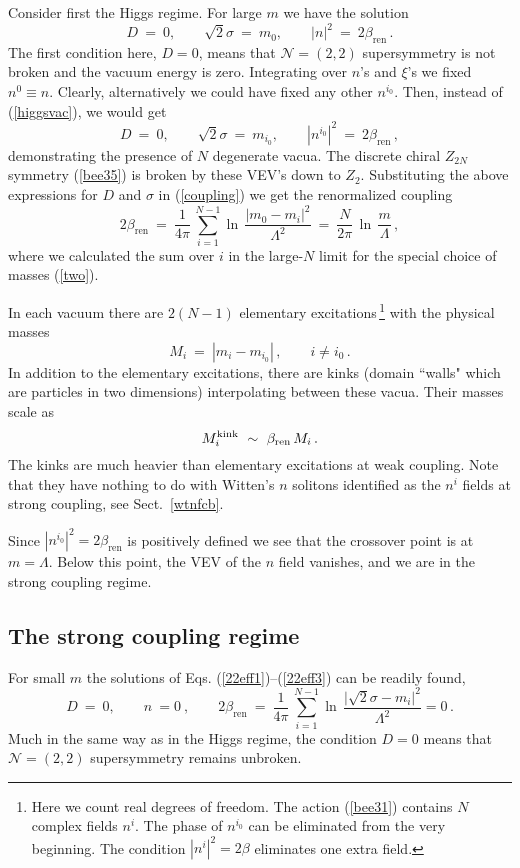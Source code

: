 \documentclass[epsfig,12pt]{article}
\def\beq{\begin{equation}}
\def\eeq{\end{equation}}
\def\beq{\begin{equation}}
\def\eeq{\end{equation}}
\newcommand{\ntwot}{${\mathcal N}= \left(2,2\right) $ }
\newcommand{\bren}{{\beta_\text{ren}}}
\begin{document}
Consider first the Higgs regime.
For large $m$ we have the solution
\beq
D~=~0,\qquad \sqrt{2}\sigma~=~m_0,\qquad |n|^2~=~2\bren \,.
\label{higgsvac}
\eeq
The first condition here, $D=0$, means that \ntwot supersymmetry is not broken and the vacuum
energy is zero. Integrating over $n$'s and $\xi$'s we fixed $n^{0}\equiv n$. Clearly,
alternatively  we could have fixed
any other $n^{i_0}$. Then, instead of (\ref{higgsvac}), we would get
\beq
D~=~0,\qquad \sqrt{2}\sigma~=~m_{i_0},\qquad |n^{i_0}|^2~=~2\bren\,,
\label{higgsvacN}
\eeq
demonstrating the  presence of $N$ degenerate vacua. The discrete chiral $Z_{2N}$ symmetry (\ref{bee35})
is broken by these VEV's down to $Z_2$. Substituting 
the above  expressions   for $D$ and $\sigma$ in (\ref{coupling})
we get the renormalized coupling 
\beq
2\bren~=~\frac{1}{4\pi}\, 
\sum_{i=1}^{N-1}\ln\, {\frac{|m_{0}-m_i|^2}{\Lambda^2}}~=~\frac{N}{2\pi}\,\ln\,{\frac{m}{\Lambda}}\, ,
\label{22higgscoupling}
\eeq
where we calculated the sum over $i$ in the large-$N$ limit for the special choice of masses
(\ref{two}).

In each vacuum there are $2(N-1)$ elementary excitations\,\footnote{Here we count
real degrees of
freedom. The action (\ref{bee31}) contains $N$ complex fields
$n^i$.
The phase of $n^{i_0}$ can be eliminated from the very beginning.
The condition $|n^i|^2 = 2\beta$ eliminates one extra field.} 
with the physical masses
\beq
M_i ~=~ |m_i-m_{i_0}|\,,\qquad i\neq i_0\,.
\label{elmass}
\eeq
In addition to the elementary excitations, there are kinks (domain ``walls" which are particles in two
dimensions) interpolating between these vacua. 
Their masses scale as
\beq
M^{\rm kink}_{i} ~\sim~ \bren\,M_i \,.
\label{kinkmass}
\eeq
The kinks  are much  heavier than elementary
excitations at weak coupling. Note that they have nothing to do
with Witten's $n$ solitons \cite{W79} identified as the $n^i$ fields at
strong coupling, see Sect.~\ref{wtnfcb}.

Since $|n^{i_0}|^2=2\bren$ is positively defined we see that the crossover point is
at $m=\Lambda$. Below this point, the VEV of the $n$ field vanishes,
 and we are in the strong coupling regime.

\subsection{The strong coupling regime}
\label{tscreg}

For small $m$ the
solutions of Eqs. (\ref{22eff1})--(\ref{22eff3}) can be readily found,
\beq
D~=~0,\qquad n~=0~,\qquad
2\bren~=~\frac{1}{4\pi}\, 
\sum_{i=1}^{N-1}\ln\, {\frac{\bigl|\sqrt{2}\sigma-m_i\bigr|^2}{\Lambda^2}}=0 \,.
\label{strongvac}
\eeq
Much in the same way as in the Higgs regime, the condition $D=0$ means that   \ntwot
 supersymmetry remains unbroken.
 
\end{document}
